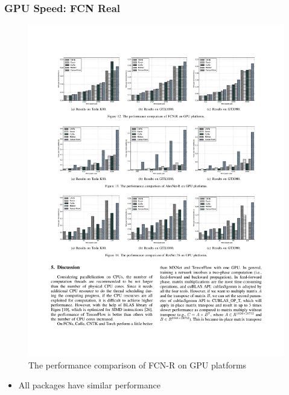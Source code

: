 \begin{frame}
	\MyLogo
	\frametitle{GPU Speed: FCN Real}
	
	\begin{figure}[htbp] 
		\includegraphics[width=\linewidth]{figures/FCN-R2.pdf} 
		\caption{The performance comparison of FCN-R on GPU platforms}
	\end{figure}

\vskip -10pt
\begin{mdframed}[style=mystyle1]
\begin{itemize}
\item All packages have similar performance
\end{itemize}
\end{mdframed}

\end{frame}


